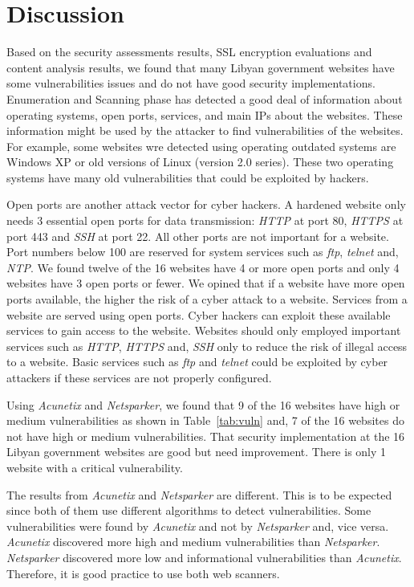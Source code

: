 \documentclass[conference]{IEEEtran}
\begin{document}
\section{Discussion}


Based on the security assessments results, SSL encryption
evaluations and content analysis results, we found that many
Libyan government websites have some vulnerabilities issues and
do not have good security implementations. Enumeration and Scanning
phase has detected a good deal of information about
operating systems, open ports, services, and main IPs about
the websites.  These information might be used by the
attacker to find vulnerabilities of the websites. For
example, some websites wre detected using operating outdated
systems are Windows XP or old versions of Linux (version 2.0
series). These two operating systems have many old
vulnerabilities that could be exploited by hackers.

Open ports are another attack vector for cyber hackers. A
hardened website only needs 3 essential open ports for data
transmission: \emph{HTTP} at port 80, \emph{HTTPS} at port
443 and \emph{SSH} at port 22. All other ports are not
important for a website. Port numbers below 100 are
reserved for system services such as \emph{ftp},
\emph{telnet} and, \emph{NTP}. We found twelve of the 16 websites
have 4 or more open ports and only 4 websites have 3 open
ports or fewer. We opined that if a website have more open ports available, the higher the risk of a cyber attack to a website.
Services from a website are served using open ports. Cyber
hackers can exploit these available services to gain access to the website. Websites should only employed important services
such as \emph{HTTP}, \emph{HTTPS} and, \emph{SSH} only to
reduce the risk of illegal access to a website. Basic services such as
\emph{ftp} and \emph{telnet} could be exploited by cyber
attackers if these services are not properly configured.

Using \emph{Acunetix} and \emph{Netsparker}, we found that 9
of the 16 websites have high or medium vulnerabilities as
shown in Table~\ref{tab:vuln} and, 7 of the 16 websites do
not have high or medium vulnerabilities. That security
implementation at the 16 Libyan government websites are
good but need improvement. There is only 1 website with a
critical vulnerability.

The results from \emph{Acunetix} and \emph{Netsparker} are
different. This is to be expected since both of them use
different algorithms to detect vulnerabilities. Some
vulnerabilities were found by \emph{Acunetix} and not by
\emph{Netsparker} and, vice versa. \emph{Acunetix}
discovered more high and medium vulnerabilities than
\emph{Netsparker}. \emph{Netsparker} discovered more low and
informational vulnerabilities than \emph{Acunetix}.
Therefore, it is good practice to use both web scanners.
\end{document}
